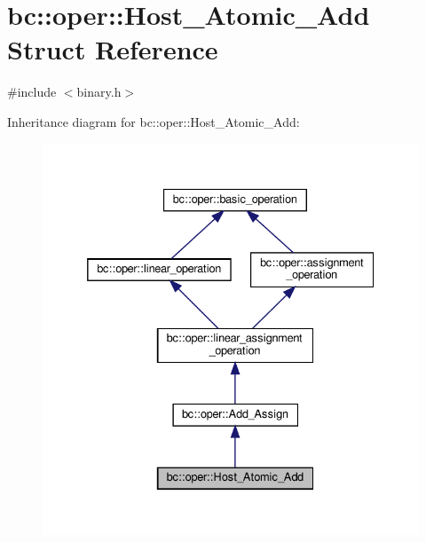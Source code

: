 \hypertarget{structbc_1_1oper_1_1Host__Atomic__Add}{}\section{bc\+:\+:oper\+:\+:Host\+\_\+\+Atomic\+\_\+\+Add Struct Reference}
\label{structbc_1_1oper_1_1Host__Atomic__Add}


{\ttfamily \#include $<$binary.\+h$>$}



Inheritance diagram for bc\+:\+:oper\+:\+:Host\+\_\+\+Atomic\+\_\+\+Add\+:\nopagebreak
\begin{figure}[H]
\begin{center}
\leavevmode
\includegraphics[width=332pt]{structbc_1_1oper_1_1Host__Atomic__Add__inherit__graph}
\end{center}
\end{figure}


